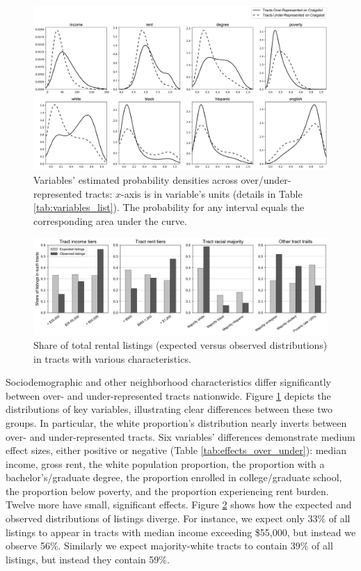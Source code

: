 \documentclass[11pt,letterpaper]{article}
\begin{document}
\begin{figure}[tbp]
	\centering
	\includegraphics[width=1\textwidth]{fig_variable_distributions.png}
	\caption{Variables' estimated probability densities across over/under- represented tracts: $x$-axis is in variable's units (details in Table \ref{tab:variables_list}). The probability for any interval equals the corresponding area under the curve.}
	\label{fig:variable_distributions}
\end{figure}

\begin{figure}[tbp]
	\centering
	\includegraphics[width=1\textwidth]{fig_tract_shares_grouped.png}
	\caption{Share of total rental listings (expected versus observed distributions) in tracts with various characteristics.}
	\label{fig:tract_shares}
\end{figure}

Sociodemographic and other neighborhood characteristics differ significantly between over- and under-represented tracts nationwide. Figure \ref{fig:variable_distributions} depicts the distributions of key variables, illustrating clear differences between these two groups. In particular, the white proportion's distribution nearly inverts between over- and under-represented tracts. Six variables' differences demonstrate medium effect sizes, either positive or negative (Table \ref{tab:effects_over_under}): median income, gross rent, the white population proportion, the proportion with a bachelor's/graduate degree, the proportion enrolled in college/graduate school, the proportion below poverty, and the proportion experiencing rent burden. Twelve more have small, significant effects. Figure \ref{fig:tract_shares} shows how the expected and observed distributions of listings diverge. For instance, we expect only 33\% of all listings to appear in tracts with median income exceeding \$55,000, but instead we observe 56\%. Similarly we expect majority-white tracts to contain 39\% of all listings, but instead they contain 59\%.
\end{document}
